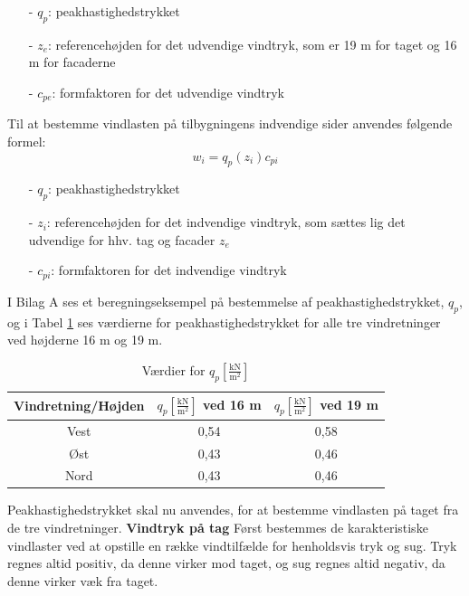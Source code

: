 \begin{itemize}
	\item[-] $q_p$: peakhastighedstrykket
	\item[-] $z_e$: referencehøjden for det udvendige vindtryk, som er 19 m for taget og 16 m for facaderne
	\item[-] $c_{pe}$: formfaktoren for det udvendige vindtryk
\end{itemize}

Til at bestemme vindlasten på tilbygningens indvendige sider anvendes følgende formel:
\begin{equation} 
	w_i = q_p(z_i)c_{pi}
\end{equation}
\begin{itemize}
	\item[-] $q_p$: peakhastighedstrykket
	\item[-] $z_i$: referencehøjden for det indvendige vindtryk, som sættes lig det udvendige for hhv. tag og facader $z_e$ \citep[ kapitel 7.2.9]{EU91}
	\item[-] $c_{pi}$: formfaktoren for det indvendige vindtryk
\end{itemize}

I Bilag A ses et beregningseksempel på bestemmelse af peakhastighedstrykket, $q_p$, og i Tabel \ref{tab:peak} ses værdierne for peakhastighedstrykket for alle tre vindretninger ved højderne 16 m og 19 m.
\begin{table}[htb]
\begin{center}
	\begin{tabular}{ c c c| } 
		\hline
		Vindretning/Højden & $q_p [\frac{\text{kN}}{\text{m}^2}]$ ved 16 m & $q_p [\frac{\text{kN}}{\text{m}^2}]$ ved 19 m \\	\hline
		Vest & 0,54 & 0,58 \\	
		Øst & 0,43 & 0,46 \\
		Nord & 0,43 & 0,46 \\
	\end{tabular}
		\caption{Værdier for $q_p [\frac{\text{kN}}{\text{m}^2}]$}
		\label{tab:peak}
\end{center}
\end{table}

Peakhastighedstrykket skal nu anvendes, for at bestemme vindlasten på taget fra de tre vindretninger.
\newline
\newline
\textbf{Vindtryk på tag}
\newline
Først bestemmes de karakteristiske vindlaster ved at opstille en række vindtilfælde for henholdsvis tryk og sug. Tryk regnes altid positiv, da denne virker mod taget, og sug regnes altid negativ, da denne virker væk fra taget.


